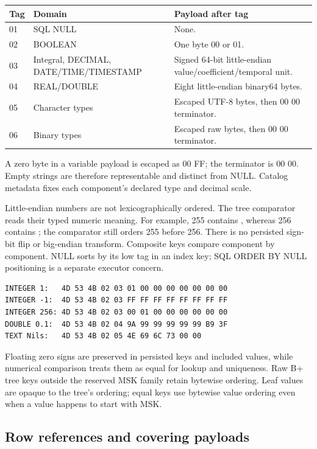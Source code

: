 \begin{longtable}{p{.12\linewidth}p{.27\linewidth}p{.5\linewidth}}
\toprule Tag & Domain & Payload after tag \\\midrule
01 & SQL NULL & None. \\
02 & BOOLEAN & One byte 00 or 01. \\
03 & Integral, DECIMAL, DATE/TIME/TIMESTAMP & Signed 64-bit little-endian value/coefficient/temporal unit. \\
04 & REAL/DOUBLE & Eight little-endian binary64 bytes. \\
05 & Character types & Escaped UTF-8 bytes, then 00 00 terminator. \\
06 & Binary types & Escaped raw bytes, then 00 00 terminator. \\
\bottomrule
\end{longtable}

A zero byte in a variable payload is escaped as 00 FF; the terminator is 00 00. Empty strings are therefore representable and distinct from NULL. Catalog metadata fixes each component's declared type and decimal scale.

Little-endian numbers are not lexicographically ordered. The tree comparator reads their typed numeric meaning. For example, 255 contains , whereas 256 contains ; the comparator still orders 255 before 256. There is no persisted sign-bit flip or big-endian transform. Composite keys compare component by component. NULL sorts by its low tag in an index key; SQL ORDER BY NULL positioning is a separate executor concern.

\begin{lstlisting}
INTEGER 1:   4D 53 4B 02 03 01 00 00 00 00 00 00 00
INTEGER -1:  4D 53 4B 02 03 FF FF FF FF FF FF FF FF
INTEGER 256: 4D 53 4B 02 03 00 01 00 00 00 00 00 00
DOUBLE 0.1:  4D 53 4B 02 04 9A 99 99 99 99 99 B9 3F
TEXT Nils:   4D 53 4B 02 05 4E 69 6C 73 00 00
\end{lstlisting}

Floating zero signs are preserved in persisted keys and included values, while numerical comparison treats them as equal for lookup and uniqueness. Raw B+ tree keys outside the reserved MSK family retain bytewise ordering. Leaf values are opaque to the tree's ordering; equal keys use bytewise value ordering even when a value happens to start with MSK.

\subsection{Row references and covering payloads}

